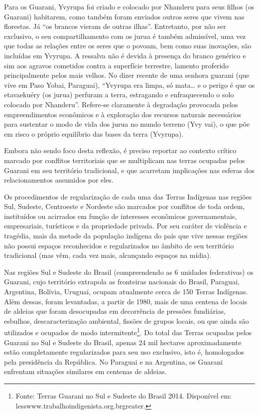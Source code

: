 {{Para os Guarani, Yvyrupa foi criado e colocado por Nhanderu para seus
filhos (os Guarani) habitarem, como também foram enviados outros seres
que vivem nas florestas. Já ``os brancos vieram de outras ilhas''.
Entretanto, por não ser exclusivo, o seu compartilhamento com os jurua
é também admissível, uma vez que todas as relações entre os seres que o
povoam, bem como suas inovações, são incluídas em Yvyrupa. A ressalva
não é devida à presença do branco genérico e sim aos agravos cometidos
contra a superfície terrestre, lamento proferido principalmente pelos
mais velhos. No dizer recente de uma senhora guarani (que vive em Paso
Yobai, Paraguai), ``Yvyrupa era limpa, só mata\ldots{} e o perigo é que os
etavaekuéry (os jurua) perfuram a terra, estragando e enfraquecendo o
solo colocado por Nhanderu''. Refere-se claramente à degradação
provocada pelos empreendimentos econômicos e à exploração dos recursos
naturais necessários para sustentar o modo de vida dos jurua no mundo
terreno (Yvy vai), o que põe em risco o próprio equilíbrio das bases da
terra (Yvyrupa). 

Embora não sendo foco desta reflexão, é preciso reportar ao contexto
crítico marcado por conflitos territoriais que se multiplicam nas
terras ocupadas pelos Guarani em seu território tradicional, e que
acarretam implicações nas esferas dos relacionamentos assumidos por
eles. 

Os procedimentos de regularização de cada uma das Terras Indígenas nas
regiões Sul, Sudeste, Centroeste e Nordeste são marcados por conflitos
de toda ordem, instituídos ou acirrados em função de interesses
econômicos governamentais, empresariais, turísticos e da propriedade
privada. Por seu caráter de violência e tragédia, mais da metade da
população indígena do país que vive nessas regiões não possui espaços
reconhecidos e regularizados no âmbito de seu território tradicional
(mas vêm, cada vez mais, alcançando espaços na mídia). 

Nas regiões Sul e Sudeste do Brasil (compreendendo as 6 unidades
federativas) os Guarani, cujo território extrapola as fronteiras
nacionais do Brasil, Paraguai, Argentina, Bolívia, Uruguai, ocupam
atualmente cerca de 150 Terras Indígenas. Além dessas, foram
levantadas, a partir de 1980, mais de uma centena de locais de aldeias
que foram desocupadas em decorrência de pressões fundiárias, esbulhos,
descaracterização ambiental, fissões de grupos locais, ou que ainda são
utilizados e ocupados de modo intermitente\footnote{Fonte: Terras
Guarani no Sul e Sudeste do Brasil 2014. Disponível em:
{less}www.trabalhoindigenista.org.br{greater}.}. Do total das
Terras ocupadas pelos Guarani no Sul e Sudeste do Brasil, apenas 24 mil
hectares aproximadamente estão completamente regularizados para seu uso
exclusivo, isto é, homologados pela presidência da República. No
Paraguai e na Argentina, os Guarani enfrentam situações similares em
centenas de aldeias. 

}}
